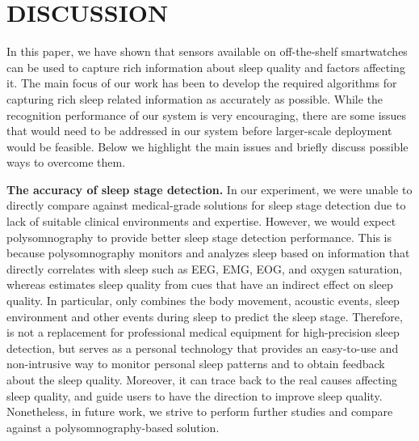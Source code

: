 \section{DISCUSSION}\label{sec:discussion}

In this paper, we have shown that sensors available on off-the-shelf smartwatches can be used to capture rich information about sleep quality and factors affecting it. The main focus of our work has been to develop the required algorithms for capturing rich sleep related information as accurately as possible. While the recognition performance of our system is very encouraging, there are some issues that would need to be addressed in our system before larger-scale deployment would be feasible. Below we highlight the main issues and briefly discuss possible ways to overcome them.


\textbf{The accuracy of sleep stage detection.} {In our experiment, we were unable to directly compare {\systemname} against medical-grade solutions for sleep stage detection due to lack of suitable clinical environments and expertise.} However, we would expect polysomnography to provide better sleep stage detection performance. This is because polysomnography monitors and analyzes sleep based on information that directly correlates with sleep such as EEG, EMG, EOG, and oxygen saturation, whereas {\systemname} estimates sleep quality from cues that have an indirect effect on sleep quality. In particular, {\systemname} only combines the body movement, acoustic events, sleep environment and other events during sleep to predict the sleep stage. Therefore, {\systemname} is not a replacement for professional medical equipment for high-precision sleep detection, but serves as a personal technology that provides an easy-to-use and non-intrusive way to monitor personal sleep patterns and to obtain feedback about the sleep quality. Moreover, it can trace back to the real causes affecting sleep quality, and guide users to have the direction to improve sleep quality. Nonetheless, in future work, we strive to perform further studies and compare {\systemname} against a polysomnography-based solution.

